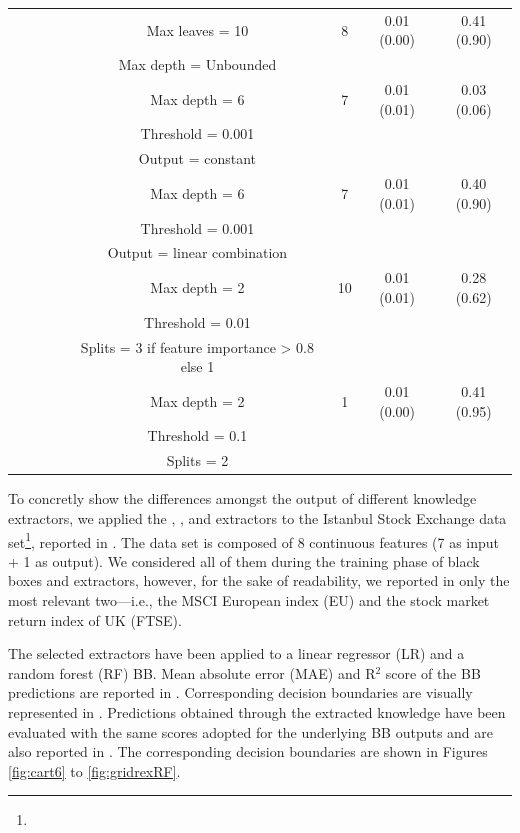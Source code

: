 \documentclass[sigconf]{acmart}
\begin{document}
\begin{table}[t]
\begin{tabular}{cccccccc}
		\cmidrule(lr){4-8}
		& & & \cart{} & Max leaves = 10 & 8 & 0.01 (0.00) & 0.41 (0.90) \\
		& & & & Max depth = Unbounded & & & \\
		\cmidrule(lr){4-8}
		& & & \creepy{} & Max depth = 6 & 7 & 0.01 (0.01) & 0.03 (0.06) \\
		& & & & Threshold = 0.001 & & & \\
		& & & & Output = constant & & & \\
		\cmidrule(lr){4-8}
		& & & \creepy{} & Max depth = 6 & 7 & 0.01 (0.01) & 0.40 (0.90) \\
		& & & & Threshold = 0.001 & & & \\
		& & & & Output = linear combination & & & \\
		\cmidrule(lr){4-8}
		& & & \gridex{} & Max depth = 2 & 10 & 0.01 (0.01) & 0.28 (0.62) \\
		& & & & Threshold = 0.01 & & & \\
		& & & & Splits = 3 if feature importance > 0.8 else 1 & & & \\
		\cmidrule(lr){4-8}
		& & & \gridrex{} & Max depth = 2 & 1 & 0.01 (0.00) & 0.41 (0.95) \\
		& & & & Threshold = 0.1 & & & \\
		& & & & Splits = 2 & & & \\
		\bottomrule
	\end{tabular}
\end{table}

To concretly show the differences amongst the output of different knowledge extractors, we applied the \cart{}, \creepy{}, \gridex{} and \gridrex{} extractors to the Istanbul Stock Exchange data set\footnote{}, reported in .
%
The data set is composed of 8 continuous features (7 as input + 1 as output).
%
We considered all of them during the training phase of black boxes and extractors, however, for the sake of readability,  we reported in  only the most relevant two---i.e., the MSCI European index (EU) and the stock market return index of UK (FTSE).

The selected extractors have been applied to a linear regressor (LR) and a random forest (RF) BB.
%
Mean absolute error (MAE) and R$^2$ score of the BB predictions are reported in .
%
Corresponding decision boundaries are visually represented in .
%
Predictions obtained through the extracted knowledge have been evaluated with the same scores adopted for the underlying BB outputs and are also reported in .
%
The corresponding decision boundaries are shown in Figures \ref{fig:cart6} to \ref{fig:gridrexRF}.
\end{document}
